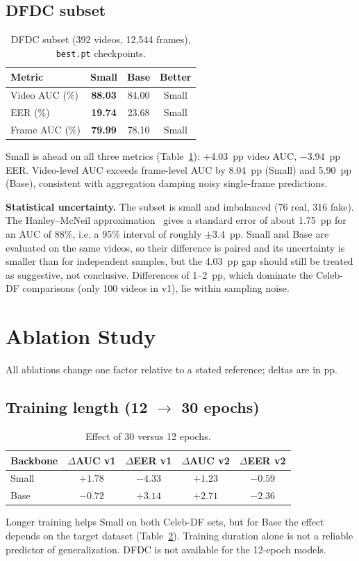 \documentclass[lettersize,journal]{IEEEtran}
\begin{document}
\subsection{DFDC subset}
\begin{table}[!t]
\caption{DFDC subset (392 videos, 12{,}544 frames), \texttt{best.pt} checkpoints.\label{tab:dfdc}}
\centering
\footnotesize
\begin{tabular}{|l||c|c|c|}
\hline
Metric & Small & Base & Better\\
\hline
Video AUC (\%) & \textbf{88.03} & 84.00 & Small\\
EER (\%) & \textbf{19.74} & 23.68 & Small\\
Frame AUC (\%) & \textbf{79.99} & 78.10 & Small\\
\hline
\end{tabular}
\end{table}
Small is ahead on all three metrics (Table~\ref{tab:dfdc}): +4.03~pp video AUC, $-3.94$~pp EER. Video-level AUC exceeds frame-level AUC by 8.04~pp (Small) and 5.90~pp (Base), consistent with aggregation damping noisy single-frame predictions.

\textbf{Statistical uncertainty.} The subset is small and imbalanced (76 real, 316 fake). The Hanley--McNeil approximation~\cite{hanley1982meaning} gives a standard error of about 1.75~pp for an AUC of 88\%, i.e. a 95\% interval of roughly $\pm3.4$~pp. Small and Base are evaluated on the same videos, so their difference is paired and its uncertainty is smaller than for independent samples, but the 4.03~pp gap should still be treated as suggestive, not conclusive. Differences of 1--2~pp, which dominate the Celeb-DF comparisons (only 100 videos in v1), lie within sampling noise.

\section{Ablation Study}
All ablations change one factor relative to a stated reference; deltas are in pp.

\subsection{Training length (12 $\to$ 30 epochs)}
\begin{table}[!t]
\caption{Effect of 30 versus 12 epochs.\label{tab:epochs}}
\centering
\footnotesize
\setlength{\tabcolsep}{3pt}
\begin{tabular}{|l||c|c|c|c|}
\hline
Backbone & $\Delta$AUC v1 & $\Delta$EER v1 & $\Delta$AUC v2 & $\Delta$EER v2\\
\hline
Small & $+1.78$ & $-4.33$ & $+1.23$ & $-0.59$\\
Base & $-0.72$ & $+3.14$ & $+2.71$ & $-2.36$\\
\hline
\end{tabular}
\end{table}
Longer training helps Small on both Celeb-DF sets, but for Base the effect depends on the target dataset (Table~\ref{tab:epochs}). Training duration alone is not a reliable predictor of generalization. DFDC is not available for the 12-epoch models.
\end{document}
